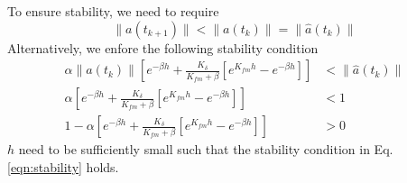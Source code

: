 \documentclass{article}
\begin{document}
To ensure stability, we need to require
\begin{equation}
	\|a(t_{k+1})\| < \|a(t_k)\| = \|\hat{a}(t_k)\| 
\end{equation}
Alternatively, we enfore the following stability condition
\begin{equation}\label{eqn:stability}
	\begin{aligned}
		\alpha\|\hat{a}(t_k)\|\left[e^{-\beta h} + \frac{K_{\delta}}{K_{fm} + \beta}[e^{K_{fm}h} - e^{-\beta h}]\right] &< \|\hat{a}(t_k)\| \\
		\alpha\left[e^{-\beta h} + \frac{K_{\delta}}{K_{fm} + \beta}[e^{K_{fm}h} - e^{-\beta h}]\right] &< 1\\
		1 - \alpha\left[e^{-\beta h} + \frac{K_{\delta}}{K_{fm} + \beta}[e^{K_{fm}h} - e^{-\beta h}]\right] &> 0
	\end{aligned}
\end{equation}
$h$ need to be sufficiently small such that the stability condition in Eq.\ref{eqn:stability} holds.
\end{document}
